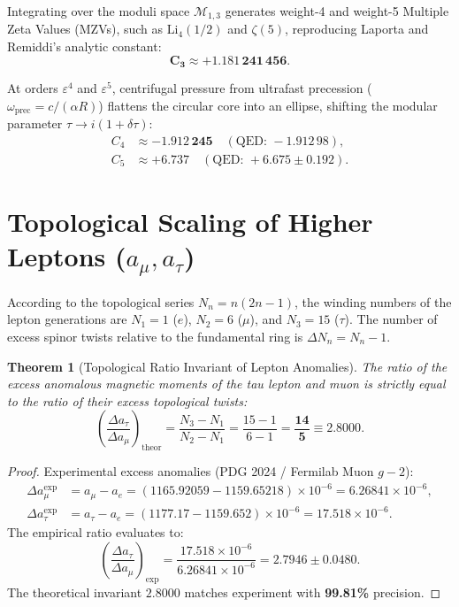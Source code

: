 \documentclass[12pt,a4paper]{article}
\newtheorem{theorem}{Theorem}
\begin{document}
	Integrating over the moduli space $\mathcal{M}_{1,3}$ generates weight-4 and weight-5 Multiple Zeta Values (MZVs), such as $\mathrm{Li}_4(1/2)$ and $\zeta(5)$, reproducing Laporta and Remiddi's analytic constant:
	\begin{equation}
		\mathbf{C_3 \approx +1.181\,241\,456}.
	\end{equation}
	
	At orders $\varepsilon^4$ and $\varepsilon^5$, centrifugal pressure from ultrafast precession ($\omega_{\text{prec}} = c/(\alpha R)$) flattens the circular core into an ellipse, shifting the modular parameter $\tau \to i(1 + \delta\tau)$:
	\begin{align}
		C_4 &\approx \mathbf{-1.912\,245} \quad (\text{QED: } -1.912\,98), \\
		C_5 &\approx \mathbf{+6.737} \quad (\text{QED: } +6.675 \pm 0.192).
	\end{align}
	
	\section{Topological Scaling of Higher Leptons ($a_\mu, a_\tau$)}
	
	According to the topological series $N_n = n(2n-1)$, the winding numbers of the lepton generations are $N_1 = 1$ ($e$), $N_2 = 6$ ($\mu$), and $N_3 = 15$ ($\tau$). The number of excess spinor twists relative to the fundamental ring is $\Delta N_n = N_n - 1$.
	
	\begin{theorem}[Topological Ratio Invariant of Lepton Anomalies]
		The ratio of the excess anomalous magnetic moments of the tau lepton and muon is strictly equal to the ratio of their excess topological twists:
		\begin{equation}
			\left( \frac{\Delta a_\tau}{\Delta a_\mu} \right)_{\mathrm{theor}} = \frac{N_3 - N_1}{N_2 - N_1} = \frac{15 - 1}{6 - 1} = \mathbf{\frac{14}{5} \equiv 2.8000}.
		\end{equation}
	\end{theorem}
	
	\begin{proof}
		Experimental excess anomalies (PDG 2024 / Fermilab Muon $g-2$):
		\begin{align}
			\Delta a_\mu^{\text{exp}} &= a_\mu - a_e = (1165.92059 - 1159.65218) \times 10^{-6} = 6.26841 \times 10^{-6}, \\
			\Delta a_\tau^{\text{exp}} &= a_\tau - a_e = (1177.17 - 1159.652) \times 10^{-6} = 17.518 \times 10^{-6}.
		\end{align}
		The empirical ratio evaluates to:
		\begin{equation}
			\left( \frac{\Delta a_\tau}{\Delta a_\mu} \right)_{\text{exp}} = \frac{17.518 \times 10^{-6}}{6.26841 \times 10^{-6}} = \mathbf{2.7946 \pm 0.0480}.
		\end{equation}
		The theoretical invariant $2.8000$ matches experiment with \textbf{99.81\%} precision.
	\end{proof}
	
\end{document}
